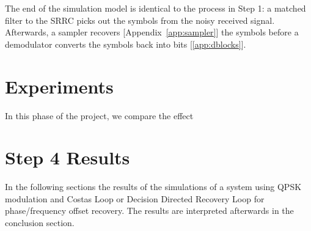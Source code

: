 \documentclass[]{article}
\begin{document}
The end of the simulation model is identical to the process in Step 1: a matched filter to the SRRC picks out the symbols from the noisy received signal.  Afterwards, a sampler recovers [Appendix~\ref{app:sampler}] the symbols before a demodulator converts the symbols back into bits [\ref{app:dblocks}].  

\section{Experiments}
\label{sec:experiments}
In this phase of the project, we compare the effect 

\section{Step 4 Results}
\label{sec:results}
In the following sections the results of the simulations of a system using QPSK modulation and Costas Loop or Decision Directed Recovery Loop for phase/frequency offset recovery. The results are interpreted afterwards in the conclusion section.
\end{document}
